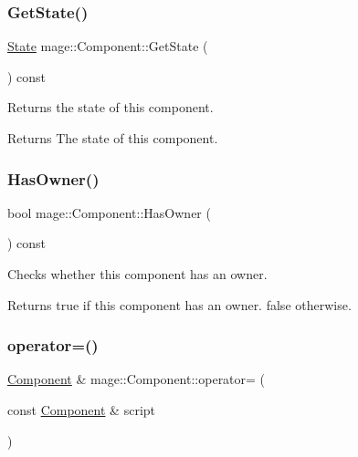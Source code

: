 \subsubsection{\texorpdfstring{Get\+State()}{GetState()}}
{\footnotesize\ttfamily \hyperlink{namespacemage_a8159a53ed2ac3a0fe7058b2a051fa969}{State} mage\+::\+Component\+::\+Get\+State (\begin{DoxyParamCaption}{ }\end{DoxyParamCaption}) const\hspace{0.3cm}{\ttfamily [noexcept]}}

Returns the state of this component.

\begin{DoxyReturn}{Returns}
The state of this component. 
\end{DoxyReturn}
\hypertarget{classmage_1_1_component_a8e62e223bdacc3eebddc43f8ebc8c4d9}{}\label{classmage_1_1_component_a8e62e223bdacc3eebddc43f8ebc8c4d9} 
\subsubsection{\texorpdfstring{Has\+Owner()}{HasOwner()}}
{\footnotesize\ttfamily bool mage\+::\+Component\+::\+Has\+Owner (\begin{DoxyParamCaption}{ }\end{DoxyParamCaption}) const\hspace{0.3cm}{\ttfamily [noexcept]}}

Checks whether this component has an owner.

\begin{DoxyReturn}{Returns}
{\ttfamily true} if this component has an owner. {\ttfamily false} otherwise. 
\end{DoxyReturn}
\hypertarget{classmage_1_1_component_a69c2e920fb88323fa0fc5174671f4a01}{}\label{classmage_1_1_component_a69c2e920fb88323fa0fc5174671f4a01} 
\subsubsection{\texorpdfstring{operator=()}{operator=()}\hspace{0.1cm}{\footnotesize\ttfamily [1/2]}}
{\footnotesize\ttfamily \hyperlink{classmage_1_1_component}{Component} \& mage\+::\+Component\+::operator= (\begin{DoxyParamCaption}\item[{const \hyperlink{classmage_1_1_component}{Component} \&}]{script }\end{DoxyParamCaption})\hspace{0.3cm}{\ttfamily [noexcept]}}

